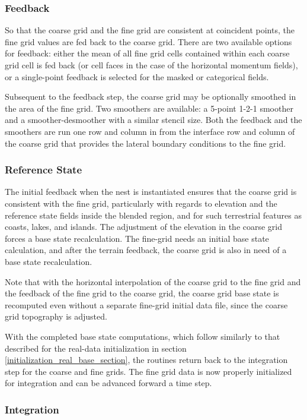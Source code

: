 \subsubsection{Feedback}
So that the coarse grid and the fine grid are consistent at coincident points, the 
fine grid values are fed back to the coarse grid.
There are two available 
options for feedback: either the mean of all fine grid cells contained 
within each coarse grid cell is fed back (or cell faces in the case of the
horizontal momentum fields), or a single-point feedback 
is selected for the masked or categorical fields.

Subsequent to the feedback step, the coarse grid may be optionally smoothed in the area
of the fine grid.  Two smoothers are available: a 5-point 1-2-1 smoother and a smoother-desmoother
with a similar stencil size.
Both the feedback and the smoothers are run one row and column in from the 
interface row and column of the coarse grid that provides
the lateral boundary conditions to the fine grid.

\subsubsection{Reference State}
The initial feedback when the nest is instantiated ensures
that the coarse grid is consistent with the fine grid, particularly 
with regards to elevation and the reference state fields inside the blended region, and for such 
terrestrial features as coasts, lakes, and islands.  The adjustment 
of the elevation in the coarse grid forces a base state recalculation.  
The fine-grid needs an initial base state calculation, and after
the terrain feedback, the coarse grid is also in need of a base state
recalculation.

Note that with the horizontal interpolation of the coarse grid 
to the fine grid and the feedback of the fine grid to the coarse 
grid, 
the coarse grid base state is recomputed 
even without a separate fine-grid initial data file, 
since the coarse grid topography is adjusted.

With the completed base state computations, which follow similarly to
that described for the real-data initialization in section
\ref{initialization_real_base_section},
the routines return 
back to the integration step for the coarse and fine grids.
The fine grid data is now properly initialized for integration and
can be advanced forward a time step.

\subsubsection{Integration}

